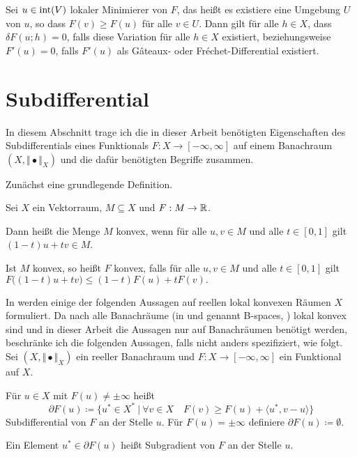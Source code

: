 \begin{theorem}
  \label{thm:necessaryConditionFreeLocalExtrema}
  Sei $u\in \operatorname{int}(V)$ lokaler Minimierer von $F$, das heißt
  es existiere eine Umgebung 
  $U$ von $u$, so dass $F(v)\geq F(u)$ für alle $v\in U$. Dann gilt für alle
  $h\in X$, dass $\delta F(u;h) = 0$, falls diese Variation für alle $h\in X$
  existiert, beziehungsweise $F'(u) = 0$, falls $F'(u)$ als 
  G\^ateaux- oder Fr\'echet-Differential existiert.
\end{theorem}

\section{Subdifferential}
In diesem Abschnitt trage ich die in dieser Arbeit benötigten Eigenschaften 
des Subdifferentials eines Funktionals $F:X\to [-\infty,\infty]$ 
auf einem Banachraum 
$(X,\Vert\bullet\Vert_X)$ und die dafür benötigten Begriffe zusammen.

Zunächst eine grundlegende Definition.

\begin{definition}
  Sei $X$ ein Vektorraum, $M\subseteq X$ und $F:M\to\mathbb{R}$. 
  
  Dann heißt die Menge $M$ konvex, wenn für alle $u,v\in M$ und alle $t\in
  [0,1]$ gilt $(1-t)u+tv\in M$.

  Ist $M$ konvex, so heißt $F$ konvex, falls für alle $u,v\in M$ und alle
  $t\in[0,1]$ gilt $F\big( (1-t)u+tv\big)\leq (1-t)F(u)+t F(v).$
\end{definition}

In \cite{Zei85} werden einige der folgenden Aussagen auf reellen lokal konvexen
Räumen $X$ formuliert.
Da nach \cite[S. 781, (43)]{Zei86} alle Banachräume 
(in \cite{Zei86} und \cite{Zei85} genannt \glqq B-spaces\grqq, \cite[S.
786]{Zei86}) lokal
konvex sind und in dieser Arbeit die Aussagen nur auf Banachräumen benötigt
werden, beschränke ich
die folgenden Aussagen, falls nicht anders spezifiziert, wie folgt.
Sei $(X,\Vert\bullet\Vert_X)$ ein reeller Banachraum und
$F:X\to [-\infty,\infty]$ ein Funktional auf $X$.

\begin{definition}
  \label{def:subdifferential}
  Für $u\in X$ mit $F(u)\neq\pm\infty$ heißt
  \begin{equation}
    \label{eq:subdifferential}
    \partial F(u)\coloneqq
    \{u^\ast\in X^\ast\ |\ 
    \forall v\in X\quad F(v)\geq F(u)+\langle u^\ast,v-u\rangle\}  
  \end{equation}
  Subdifferential von $F$ an der Stelle $u$. Für $F(u)=\pm\infty$ definiere
  $\partial F(u)\coloneq\emptyset$.

  Ein Element $u^\ast\in\partial F(u)$ heißt Subgradient von $F$ an der Stelle
  $u$.
\end{definition}

